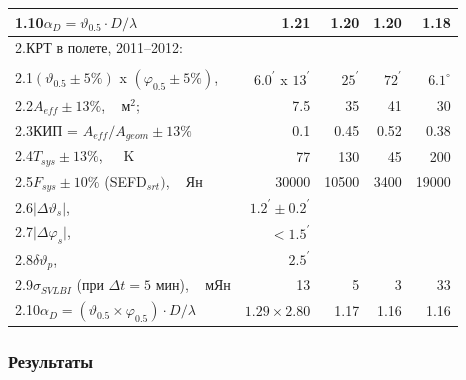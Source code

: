 \begin{table}[tbh]
\begin{SingleSpace}
\begin{tabular}{l|r|r|r|r}
1.10\quad  $\alpha_D = \vartheta_{0.5} \cdot D / \lambda$\,\,\,                     & 1.21   & 1.20
& 1.20 & 1.18\\
\hline
2.\quad  КРТ в полете, 2011--2012: & & & &\\
                       & & & &\\
2.1\quad  $(\vartheta_{0.5} \pm 5 \%)$ x $(\varphi_{0.5} \pm 5 \%)$,\,
& $6.0^\prime$ x $13^\prime$ & $25^\prime$    & $72^\prime$   & $6.1^\circ$ \\
2.2\quad  $A_{eff} \pm 13\%$, \,\,\, м$^2$;                            & 7.5       & 35    & 41   &
30\\
2.3\quad  КИП = $A_{eff}/A_{geom} \pm 13\%$                            & 0.1       & 0.45  & 0.52 &
0.38\\
2.4\quad  $T_{sys} \pm 13\%$, \,\,\,\,\, K                             & 77        & 130   & 45   &
200\\
2.5\quad  $F_{sys} \pm 10\%$\,\,(SEFD$_{srt})$, \,\,\, Ян              & 30000 & 10500 & 3400 &
19000\\
2.6\quad  $\vert \Delta \vartheta_s \vert$, \,\,\,\, &$1.2^\prime \pm 0.2^\prime$            & & &
\\
2.7\quad  $\vert \Delta \varphi_s \vert$, \,\,\,\,\, &$< 1.5^\prime$            & & & \\
2.8\quad  $\delta \vartheta_p$, \,\,\,\,\,           &$2.5^\prime$              & & & \\
2.9\quad  $\sigma_{SVLBI}$ (при $\Delta t = 5$ мин), \,\,\, мЯн        & 13        & 5     & 3    &
33\\
2.10\quad  $\alpha_D = (\vartheta_{0.5}\times \varphi_{0.5}) \cdot D / \lambda$ &$1.29 \times 2.80$
&1.17 &1.16 &1.16\\
        \bottomrule
        \end{tabular}
    \end{SingleSpace}
\end{table}


\subsubsection{Результаты}


